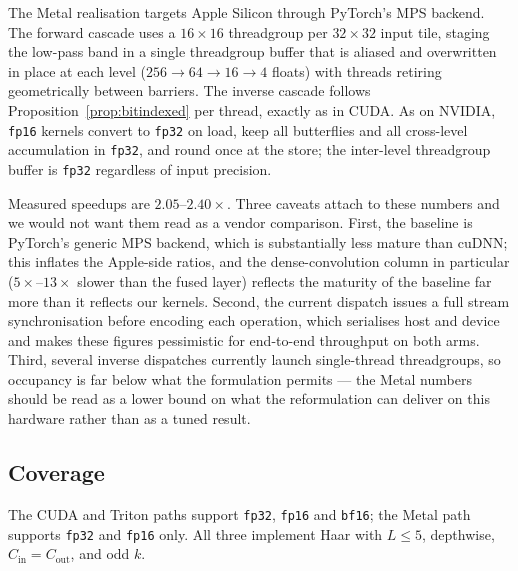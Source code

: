 The Metal realisation targets Apple Silicon through PyTorch's MPS backend. The
forward cascade uses a $16\times16$ threadgroup per $32\times32$ input tile,
staging the low-pass band in a single threadgroup buffer that is aliased and
overwritten in place at each level ($256\to64\to16\to4$ floats) with threads
retiring geometrically between barriers. The inverse cascade follows
Proposition~\ref{prop:bitindexed} per thread, exactly as in CUDA. As on NVIDIA,
\texttt{fp16} kernels convert to \texttt{fp32} on load, keep all butterflies and
all cross-level accumulation in \texttt{fp32}, and round once at the store; the
inter-level threadgroup buffer is \texttt{fp32} regardless of input precision.

Measured speedups are $2.05$--$2.40\times$. Three caveats attach to these
numbers and we would not want them read as a vendor comparison. First, the
baseline is PyTorch's generic MPS backend, which is substantially less mature
than cuDNN; this inflates the Apple-side ratios, and the dense-convolution
column in particular ($5\times$--$13\times$ slower than the fused layer) reflects
the maturity of the baseline far more than it reflects our kernels. Second, the
current dispatch issues a full stream synchronisation before encoding each
operation, which serialises host and device and makes these figures pessimistic
for end-to-end throughput on both arms. Third, several inverse dispatches
currently launch single-thread threadgroups, so occupancy is far below what the
formulation permits --- the Metal numbers should be read as a lower bound on
what the reformulation can deliver on this hardware rather than as a tuned
result.

\subsection{Coverage}

The CUDA and Triton paths support \texttt{fp32}, \texttt{fp16} and
\texttt{bf16}; the Metal path supports \texttt{fp32} and \texttt{fp16} only. All
three implement Haar with $L\le5$, depthwise, $C_{\mathrm{in}}=C_{\mathrm{out}}$,
and odd $k$.
